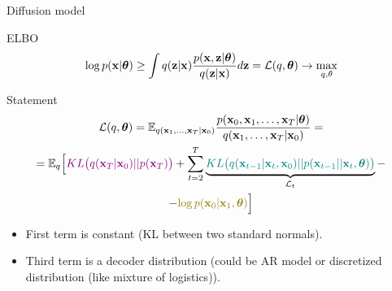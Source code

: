 \begin{frame}{Diffusion model}
	\begin{block}{ELBO}
		\vspace{-0.4cm}
		\[
			\log p(\mathbf{x} | \boldsymbol{\theta}) \geq \int q(\mathbf{z} | \mathbf{x}) \frac{p(\mathbf{x}, \mathbf{z} | \boldsymbol{\theta})}{q(\mathbf{z} | \mathbf{x})} d \mathbf{z} = \mathcal{L}(q, \boldsymbol{\theta}) \rightarrow \max_{q, \theta}
		\]
		\vspace{-0.5cm}
	\end{block}
	\begin{block}{Statement}
		\vspace{-0.8cm}
		\begin{multline*}
			\cL(q, \btheta) = \bbE_{q(\bx_1, \dots, \bx_T | \bx_0)}\frac{p(\bx_0, \bx_1, \dots, \bx_T | \btheta)}{q(\bx_1, \dots, \bx_T | \bx_0)} = \\ 
			= \bbE_{q} \Bigl[ {\color{violet}KL\bigl(q(\bx_T | \bx_0) || p(\bx_T)\bigr)}
			+ \sum_{t=2}^T \underbrace{\color{teal}KL \bigl(q(\bx_{t-1} | \bx_t, \bx_0) || p(\bx_{t - 1} || \bx_t, \btheta )\bigr)}_{\cL_t} - \\
			- {\color{olive}\log p(\bx_0 | \bx_1, \btheta)} \Bigr]
		\end{multline*}
		\vspace{-0.5cm}
	\end{block}
	\begin{itemize}
		\item {\color{violet}First term} is constant (KL between two standard normals).
		\item {\color{olive}Third term} is a decoder distribution (could be AR model or discretized distribution (like mixture of logistics)). 
	\end{itemize}
\end{frame}

